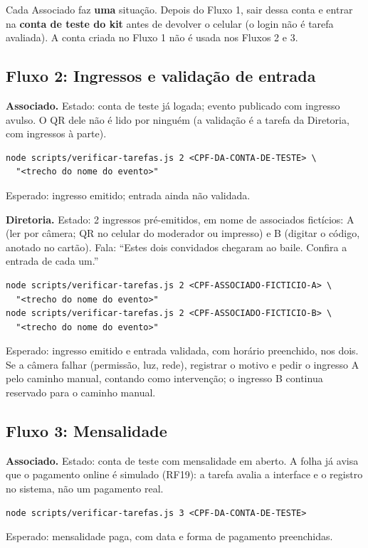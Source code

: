 \documentclass[11pt,a4paper]{article}
\begin{document}
Cada Associado faz \textbf{uma} situação. Depois do Fluxo 1, sair dessa conta e entrar na
\textbf{conta de teste do kit} antes de devolver o celular (o login não é tarefa avaliada). A conta
criada no Fluxo 1 não é usada nos Fluxos 2 e 3.

\subsection*{Fluxo 2: Ingressos e validação de entrada}

\textbf{Associado.} Estado: conta de teste já logada; evento publicado com ingresso avulso. O QR
dele não é lido por ninguém (a validação é a tarefa da Diretoria, com ingressos à parte).
\begin{small}
\begin{verbatim}
node scripts/verificar-tarefas.js 2 <CPF-DA-CONTA-DE-TESTE> \
  "<trecho do nome do evento>"
\end{verbatim}
\end{small}
Esperado: ingresso emitido; entrada ainda não validada.

\textbf{Diretoria.} Estado: 2 ingressos pré-emitidos, em nome de associados fictícios: A (ler por
câmera; QR no celular do moderador ou impresso) e B (digitar o código, anotado no cartão). Fala:
``Estes dois convidados chegaram ao baile. Confira a entrada de cada um.''
\begin{small}
\begin{verbatim}
node scripts/verificar-tarefas.js 2 <CPF-ASSOCIADO-FICTICIO-A> \
  "<trecho do nome do evento>"
node scripts/verificar-tarefas.js 2 <CPF-ASSOCIADO-FICTICIO-B> \
  "<trecho do nome do evento>"
\end{verbatim}
\end{small}
Esperado: ingresso emitido e entrada validada, com horário preenchido, nos dois. Se a câmera falhar
(permissão, luz, rede), registrar o motivo e pedir o ingresso A pelo caminho manual, contando como
intervenção; o ingresso B continua reservado para o caminho manual.

\subsection*{Fluxo 3: Mensalidade}

\textbf{Associado.} Estado: conta de teste com mensalidade em aberto. A folha já avisa que o
pagamento online é simulado (RF19): a tarefa avalia a interface e o registro no sistema, não um
pagamento real.
\begin{verbatim}
node scripts/verificar-tarefas.js 3 <CPF-DA-CONTA-DE-TESTE>
\end{verbatim}
Esperado: mensalidade paga, com data e forma de pagamento preenchidas.
\end{document}
